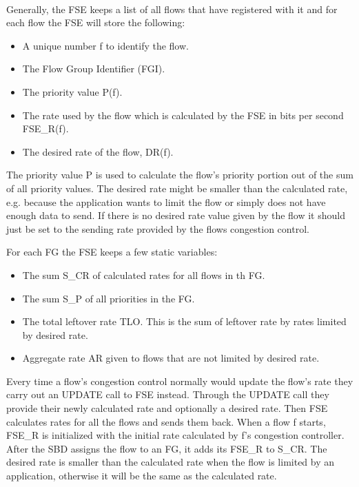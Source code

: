\paragraph{}
Generally, the FSE keeps a list of all flows that have registered with it and for each flow the FSE will store the following:
\begin{itemize}
    \item A unique number f to identify the flow.
    \item The Flow Group Identifier (FGI).
    \item The priority value P(f).
    \item The rate used by the flow which is calculated by the FSE in bits per second FSE\_R(f).
    \item The desired rate of the flow, DR(f).
\end{itemize}

The priority value P is used to calculate the flow's priority portion out of the sum of all priority values.
The desired rate might be smaller than the calculated rate, e.g. because the application wants to limit the flow or simply does not have enough data to send. 
If there is no desired rate value given by the flow it should just be set to the sending rate provided by the flows congestion control.

For each FG the FSE keeps a few static variables:
\begin{itemize}
    \item The sum S\_CR of calculated rates for all flows in th FG.
    \item The sum S\_P of all priorities in the FG.
    \item The total leftover rate TLO. This is the sum of leftover rate by rates limited by desired rate.
    \item Aggregate rate AR given to flows that are not limited by desired rate. 
\end{itemize}

Every time a flow's congestion control normally would update the flow's rate they carry out an UPDATE call to FSE instead. 
Through the UPDATE call they provide their newly calculated rate and optionally a desired rate. 
Then FSE calculates rates for all the flows and sends them back. 
When a flow f starts, FSE\_R is initialized with the initial rate calculated by f's congestion controller. 
After the SBD assigns the flow to an FG, it adds its FSE\_R to S\_CR.
The desired rate is smaller than the calculated rate when the flow is limited by an application, otherwise it will be the same as the calculated rate.

